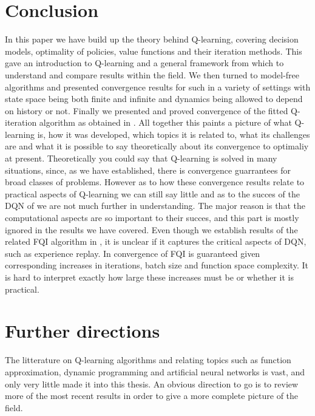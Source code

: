 \section{Conclusion}

In this paper we have build up the theory behind Q-learning,
covering decision models, optimality of policies,
value functions and their iteration methods.
This gave an introduction to Q-learning 
and a general framework from which to understand
and compare results within the field.
We then turned to model-free algorithms 
and presented convergence results for such in a variety
of settings with state space being both finite and infinite and
dynamics being allowed to depend on history or not.
Finally we presented and proved convergence of the fitted Q-iteration
algorithm as obtained in .
All together this paints a picture of what Q-learning is,
how it was developed, which topics it is related to,
what its challenges are and what it is possible to
say theoretically about its convergence to optimaliy at present.
Theoretically you could say that Q-learning is solved in many situations,
since, as we have established,
there is convergence guarrantees for broad classes of problems.
However as to how these convergence results relate to practical aspects of
Q-learning we can still say little and as to the succes of the DQN of
 we are not much further in understanding.
The major reason is that the computational aspects are so important to their 
succes, and this part is mostly ignored in the results we have covered.
Even though we establish results of the related FQI algorithm in ,
it is unclear if it captures the critical aspects of DQN,
such as experience replay.
In  convergence of FQI is guaranteed given corresponding
increases in iterations, batch size and function space complexity.
It is hard to interpret exactly how large these increases must be
or whether it is practical.

\section{Further directions}

The litterature on Q-learning algorithms and relating topics such as 
function approximation, dynamic programming and artificial neural networks
is vast, and only very little made it into this thesis. 
An obvious direction to go is to review more of the most recent results
in order to give a more complete picture of the field.

